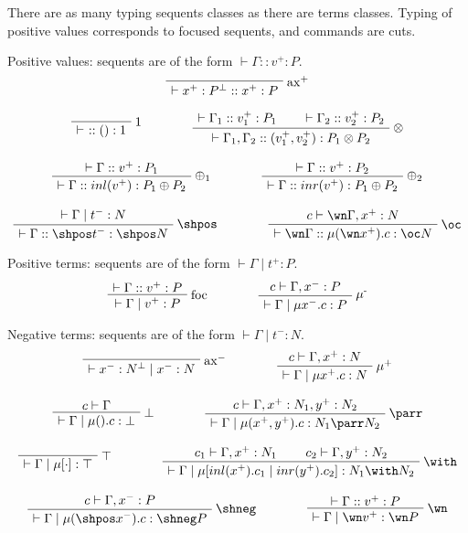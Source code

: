 There are as many typing sequents classes as there are terms classes.
Typing of positive values corresponds to focused sequents, and
commands are cuts.

Positive values: sequents are of the form \(\vdash \Gamma :: v^+ : P\).
\begin{gather*}
\LabelRule{\rulename{ax}^+}
\NulRule{\vdash x^+:P\orth :: x^+: P}
\DisplayProof
\\[2ex]
\LabelRule{1}
\NulRule{\vdash \ :: () : 1}
\DisplayProof
\qquad\qquad
\AxRule{\vdash \Gamma_1 :: v_1^+ : P_1}
\AxRule{\vdash \Gamma_2 :: v_2^+ : P_2}
\LabelRule{\rulename{\otimes}}
\BinRule{\vdash\Gamma_1, \Gamma_2 :: (v_1^+, v_2^+) : P_1\otimes P_2}
\DisplayProof
\\[2ex]
\AxRule{\vdash \Gamma :: v^+ : P_1}
\LabelRule{\rulename{\oplus_1}}
\UnaRule{\vdash\Gamma :: inl(v^+) : P_1\oplus P_2}
\DisplayProof
\qquad\qquad
\AxRule{\vdash \Gamma :: v^+ : P_2}
\LabelRule{\rulename{\oplus_2}}
\UnaRule{\vdash\Gamma :: inr(v^+) : P_1\oplus P_2}
\DisplayProof
\\[2ex]
\AxRule{\vdash \Gamma \mid t^- : N}
\LabelRule{\shpos}
\UnaRule{\vdash\Gamma :: \shpos t^- : \shpos N}
\DisplayProof
\qquad\qquad
\AxRule{c \vdash \wn\Gamma, x^+ : N}
\LabelRule{\oc}
\UnaRule{\vdash\wn\Gamma :: \mu(\wn x^+).c : \oc N}
\DisplayProof
\end{gather*}

Positive terms: sequents are of the form \(\vdash\Gamma\mid t^+:P\).
\begin{equation*}
\AxRule{\vdash \Gamma :: v^+ : P}
\LabelRule{\rulename{foc}}
\UnaRule{\vdash\Gamma \mid v^+ : P}
\DisplayProof
\qquad\qquad
\AxRule{c \vdash \Gamma, x^- : P}
\LabelRule{\rulename{\mu^-}}
\UnaRule{\vdash\Gamma \mid\mu x^-.c : P}
\DisplayProof
\end{equation*}

Negative terms: sequents are of the form \(\vdash\Gamma\mid t^-:N\).
\begin{gather*}
\LabelRule{\rulename{ax}^-}
\NulRule{\vdash x^-:N\orth \mid x^-: N}
\DisplayProof
\qquad\qquad
\AxRule{c\vdash \Gamma, x^+: N}
\LabelRule{\mu^+}
\UnaRule{\vdash\Gamma \mid \mu x^+.c : N}
\DisplayProof
\\[2ex]
\AxRule{c \vdash \Gamma}
\LabelRule{\bot}
\UnaRule{\vdash \Gamma \mid \mu().c : \bot}
\DisplayProof
\qquad\qquad
\AxRule{c\vdash \Gamma, x^+: N_1, y^+: N_2}
\LabelRule{\rulename{\parr}}
\UnaRule{\vdash\Gamma \mid \mu(x^+, y^+).c : N_1 \parr N_2}
\DisplayProof
\\[2ex]
\LabelRule{\rulename{\top}}
\NulRule{\vdash \Gamma \mid \mu[\cdot] : \top}
\DisplayProof
\qquad\qquad
\AxRule{c_1\vdash \Gamma, x^+:N_1}
\AxRule{c_2\vdash \Gamma, y^+:N_2}
\LabelRule{\rulename{\with}}
\BinRule{\vdash\Gamma \mid \mu[inl(x^+).c_1 \mid inr(y^+).c_2] : N_1 \with N_2}
\DisplayProof
\\[2ex]
\AxRule{c\vdash \Gamma, x^-: P}
\LabelRule{\shneg}
\UnaRule{\vdash\Gamma \mid \mu(\shpos x^-).c : \shneg P}
\DisplayProof
\qquad\qquad
\AxRule{\vdash \Gamma :: v^+ : P}
\LabelRule{\wn}
\UnaRule{\vdash\Gamma \mid \wn v^+ : \wn P}
\DisplayProof
\end{gather*}

